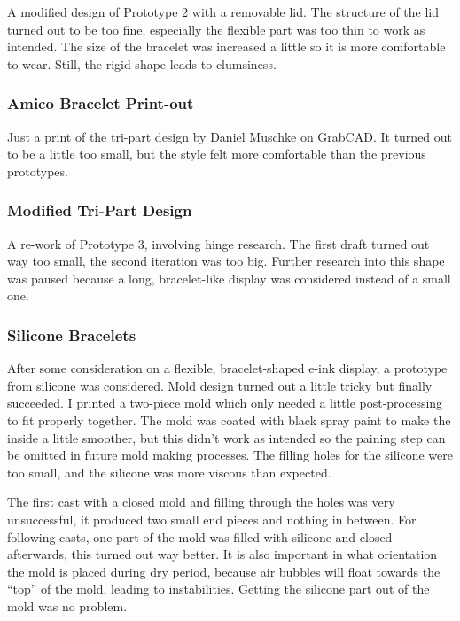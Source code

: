 A modified design of Prototype 2 with a removable lid. The structure of the lid turned out to be too fine, especially the flexible part was too thin to work as intended. The size of the bracelet was increased a little so it is more comfortable to wear. Still, the rigid shape leads to clumsiness.

\subsubsection{Amico Bracelet Print-out}

Just a print of the tri-part design by Daniel Muschke on GrabCAD. It turned out to be a little too small, but the style felt more comfortable than the previous prototypes.

\subsubsection{Modified Tri-Part Design}

A re-work of Prototype 3, involving hinge research. The first draft turned out way too small, the second iteration was too big. Further research into this shape was paused because a long, bracelet-like display was considered instead of a small one.

\subsubsection{Silicone Bracelets}

After some consideration on a flexible, bracelet-shaped e-ink display, a prototype from silicone was considered. Mold design turned out a little tricky but finally succeeded. I printed a two-piece mold which only needed a little post-processing to fit properly together. The mold was coated with black spray paint to make the inside a little smoother, but this didn't work as intended so the paining step can be omitted in future mold making processes. The filling holes for the silicone were too small, and the silicone was more viscous than expected.

The first cast with a closed mold and filling through the holes was very unsuccessful, it produced two small end pieces and nothing in between. For following casts, one part of the mold was filled with silicone and closed afterwards, this turned out way better. It is also important in what orientation the mold is placed during dry period, because air bubbles will float towards the ``top'' of the mold, leading to instabilities. Getting the silicone part out of the mold was no problem.

